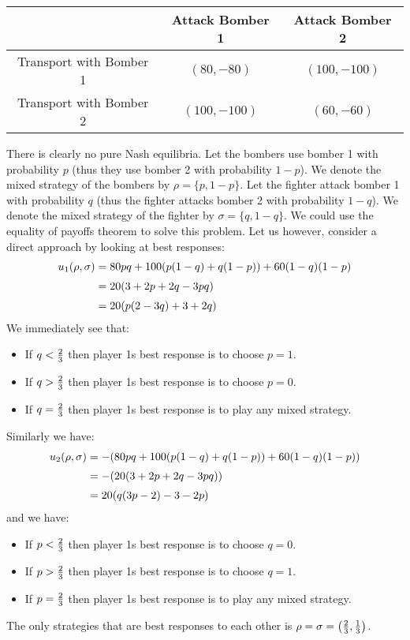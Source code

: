 \documentclass[12pt]{article}
\begin{document}
\begin{enumerate}
\begin{center}
\begin{tabular}{|c|c|c|}
\hline
  &Attack Bomber 1&Attack Bomber 2    \\\hline
Transport with Bomber 1&$(80,-80)$     &$(100,-100)$\\\hline
Transport with Bomber 2&$(100,-100)$   &$(60,-60)$\\\hline
\end{tabular}
    \end{center}
There is clearly no pure Nash equilibria. Let the bombers use bomber 1 with probability $p$ (thus they use bomber 2 with probability $1-p$). We denote the mixed strategy of the bombers by $\rho=\{p,1-p\}$. Let the fighter attack bomber 1 with probability $q$ (thus the fighter attacks bomber 2 with probability $1-q$). We denote the mixed strategy of the fighter by $\sigma=\{q,1-q\}$. We could use the equality of payoffs theorem to solve this problem. Let us however, consider a direct approach by looking at best responses:
$$\begin{array}{@{}r@{\;}c@{\;}l@{}}
u_1(\rho,\sigma)&=&80pq+100(p(1-q)+q(1-p))+60(1-q)(1-p)\\[2mm]
                &=&20(3+2p+2q-3pq)\\[2mm]
                &=&20(p(2-3q)+3+2q)
\end{array}$$
We immediately see that:
\begin{itemize}
\item If $q<{2\over3}$ then player 1s best response is to choose $p=1$.
\item If $q>{2\over3}$ then player 1s best response is to choose $p=0$.
\item If $q={2\over3}$ then player 1s best response is to play any mixed strategy.
\end{itemize}
Similarly we have:
$$\begin{array}{@{}r@{\;}c@{\;}l@{}}
u_2(\rho,\sigma)&=&-(80pq+100(p(1-q)+q(1-p))+60(1-q)(1-p))\\[2mm]
                &=&-(20(3+2p+2q-3pq))\\[2mm]
                &=&20(q(3p-2)-3-2p)
\end{array}$$
and we have:
\begin{itemize}
\item If $p<{2\over3}$ then player 1s best response is to choose $q=0$.
\item If $p>{2\over3}$ then player 1s best response is to choose $q=1$.
\item If $p={2\over3}$ then player 1s best response is to play any mixed strategy.
\end{itemize}
The only strategies that are best responses to each other is $\rho=\sigma=\left({2\over3},{1\over3}\right)$.




\end{enumerate}
\end{document}
